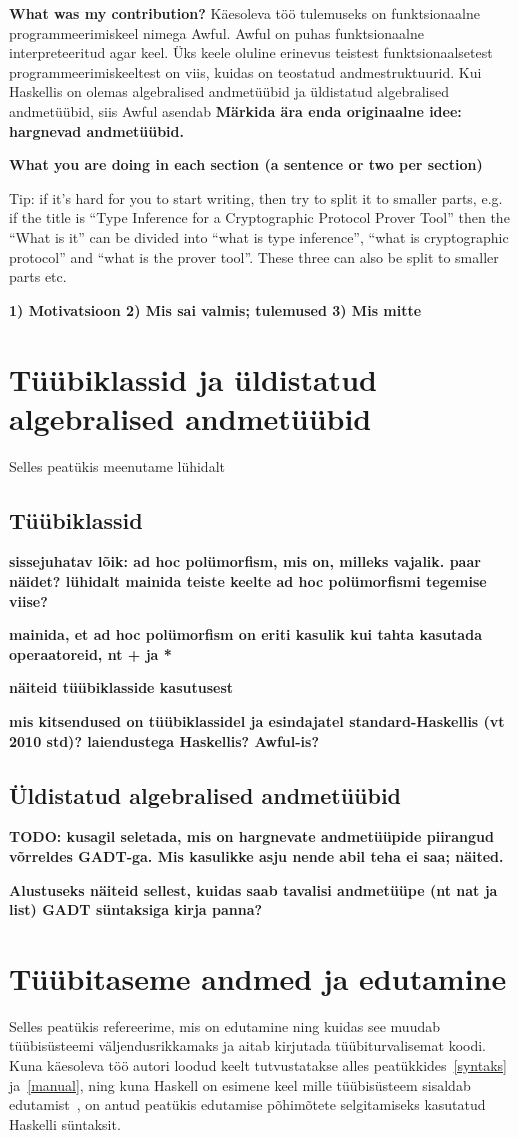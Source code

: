 \documentclass[12pt]{article}
\newcommand\peatykk[1]{
  \clearpage
  \section{#1}}
\newcommand\markus[1]{\textcolor{roheline}{\textbf{#1}}}
\begin{document}
    \markus{What was my contribution?} Käesoleva töö tulemuseks on funktsionaalne programmeerimiskeel nimega Awful. Awful on puhas funktsionaalne interpreteeritud agar keel. Üks keele oluline erinevus teistest funktsionaalsetest programmeerimiskeeltest on viis, kuidas on teostatud andmestruktuurid. Kui Haskellis on olemas algebralised andmetüübid ja üldistatud algebralised andmetüübid, siis Awful asendab \markus{Märkida ära enda originaalne idee: hargnevad andmetüübid.}

    \markus{What you are doing in each section (a sentence or two per section)}

    Tip: if it's hard for you to start writing, then try to split it to smaller parts, e.g. if the title is ``Type Inference for a Cryptographic Protocol Prover Tool'' then the ``What is it'' can be divided into ``what is type inference'', ``what is cryptographic protocol'' and ``what is the prover tool''. These three can also be split to smaller parts etc.

    \markus{1) Motivatsioon 2) Mis sai valmis; tulemused 3) Mis mitte}
  \peatykk{Tüübiklassid ja üldistatud algebralised andmetüübid}
    Selles peatükis meenutame lühidalt
    \subsection{Tüübiklassid}
      \markus{sissejuhatav lõik: ad hoc polümorfism, mis on, milleks vajalik. paar näidet? lühidalt mainida teiste keelte ad hoc polümorfismi tegemise viise?}

      \markus{mainida, et ad hoc polümorfism on eriti kasulik kui tahta kasutada operaatoreid, nt + ja *}

      \markus{näiteid tüübiklasside kasutusest}

      \markus{mis kitsendused on tüübiklassidel ja esindajatel standard-Haskellis (vt 2010 std)? laiendustega Haskellis? Awful-is?}
    \subsection{Üldistatud algebralised andmetüübid}
      \markus{TODO: kusagil seletada, mis on hargnevate andmetüüpide piirangud võrreldes GADT-ga. Mis kasulikke asju nende abil teha ei saa; näited.}

      \markus{Alustuseks näiteid sellest, kuidas saab tavalisi andmetüüpe (nt nat ja list) GADT süntaksiga kirja panna?}
  \peatykk{Tüübitaseme andmed ja edutamine}
    Selles peatükis refereerime, mis on edutamine ning kuidas see muudab tüübisüsteemi väljendusrikkamaks ja aitab kirjutada tüübiturvalisemat koodi. Kuna käesoleva töö autori loodud keelt tutvustatakse alles peatükkides~\ref{syntaks} ja~\ref{manual}, ning kuna Haskell on esimene keel mille tüübisüsteem sisaldab edutamist~\cite{Giv}, on antud peatükis edutamise põhimõtete selgitamiseks kasutatud Haskelli süntaksit.
\end{document}
